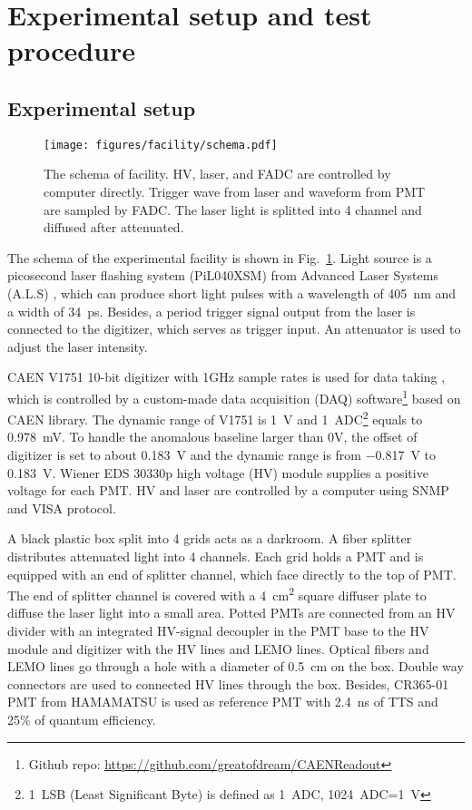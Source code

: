 \section{Experimental setup and test procedure}
\label{SetUp}
\subsection{Experimental setup}
\label{sec:setup}
\begin{figure}[!htbp]
    \centering
    \texttt{[image: figures/facility/schema.pdf]}
    \caption{The schema of facility. HV, laser, and FADC are controlled by computer directly. Trigger wave from laser and waveform from PMT are sampled by FADC. The laser light is splitted into 4 channel and diffused after attenuated.}
    \label{fig:facility}
\end{figure}

The schema of the experimental facility is shown in Fig.~\ref{fig:facility}. Light source is a picosecond laser flashing system (PiL040XSM) from Advanced Laser Systems (A.L.S) \cite{NTKLaser}, which can produce short light pulses with a wavelength of \SI{405}{nm} and a width of \SI{34}{ps}. Besides, a period trigger signal output from the laser is connected to the digitizer, which serves as trigger input. An attenuator is used to adjust the laser intensity.

CAEN V1751 10-bit digitizer with 1GHz sample rates is used for data taking \cite{CAENV1751}, which is controlled by a custom-made data acquisition (DAQ) software\footnote{Github repo: \url{https://github.com/greatofdream/CAENReadout}} based on CAEN library. The dynamic range of V1751 is \SI{1}{V} and \SI{1}{ADC}\footnote{\SI{1}{LSB} (Least Significant Byte) is defined as \SI{1}{ADC}, \SI{1024}{ADC}=\SI{1}{V}} equals to \SI{0.978}{mV}. To handle the anomalous baseline larger than 0V, the offset of digitizer is set to about \SI{0.183}{V} and the dynamic range is from \SI{-0.817}{V} to \SI{0.183}{V}. Wiener EDS 30330p high voltage (HV) module \cite{WIENERHV} supplies a positive voltage for each PMT. HV and laser are controlled by a computer using SNMP \cite{SNMP} and VISA \cite{VISA} protocol.

A black plastic box split into 4 grids acts as a darkroom. A fiber splitter %
distributes attenuated light into 4 channels. Each grid holds a PMT and is equipped with an end of splitter channel, which face directly to the top of PMT. The end of splitter channel is covered with a \SI{4}{cm\tothe{2}} square diffuser plate to diffuse the laser light into a small area. Potted PMTs are connected from an HV divider with an integrated HV-signal decoupler in the PMT base to the HV module and digitizer with the HV lines and LEMO lines. Optical fibers and LEMO lines go through a hole with a diameter of \SI{0.5}{cm} on the box. Double way connectors are used to connected HV lines through the box. Besides, CR365-01 \cite{BJBS} PMT from HAMAMATSU is used as reference PMT with \SI{2.4}{ns} of TTS and 25\% of quantum efficiency.

